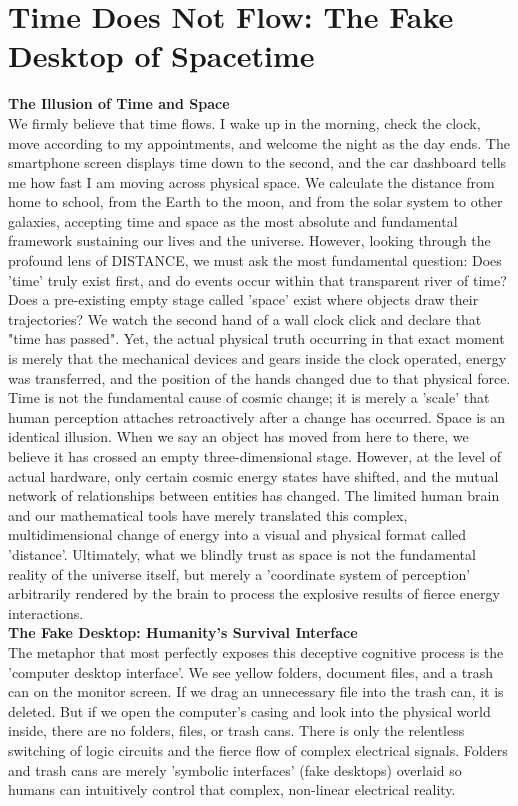 

\section{Time Does Not Flow: The Fake Desktop of Spacetime}

\textbf{The Illusion of Time and Space} \\
We firmly believe that time flows. I wake up in the morning, check the clock, move according to my appointments, and welcome the night as the day ends. The smartphone screen displays time down to the second, and the car dashboard tells me how fast I am moving across physical space. We calculate the distance from home to school, from the Earth to the moon, and from the solar system to other galaxies, accepting time and space as the most absolute and fundamental framework sustaining our lives and the universe.
However, looking through the profound lens of DISTANCE, we must ask the most fundamental question: Does 'time' truly exist first, and do events occur within that transparent river of time? Does a pre-existing empty stage called 'space' exist where objects draw their trajectories?
We watch the second hand of a wall clock click and declare that "time has passed". Yet, the actual physical truth occurring in that exact moment is merely that the mechanical devices and gears inside the clock operated, energy was transferred, and the position of the hands changed due to that physical force. Time is not the fundamental cause of cosmic change; it is merely a 'scale' that human perception attaches retroactively after a change has occurred.
Space is an identical illusion. When we say an object has moved from here to there, we believe it has crossed an empty three-dimensional stage. However, at the level of actual hardware, only certain cosmic energy states have shifted, and the mutual network of relationships between entities has changed. The limited human brain and our mathematical tools have merely translated this complex, multidimensional change of energy into a visual and physical format called 'distance'. Ultimately, what we blindly trust as space is not the fundamental reality of the universe itself, but merely a 'coordinate system of perception' arbitrarily rendered by the brain to process the explosive results of fierce energy interactions.\\
\textbf{The Fake Desktop: Humanity's Survival Interface} \\
The metaphor that most perfectly exposes this deceptive cognitive process is the 'computer desktop interface'. We see yellow folders, document files, and a trash can on the monitor screen. If we drag an unnecessary file into the trash can, it is deleted. But if we open the computer's casing and look into the physical world inside, there are no folders, files, or trash cans. There is only the relentless switching of logic circuits and the fierce flow of complex electrical signals. Folders and trash cans are merely 'symbolic interfaces' (fake desktops) overlaid so humans can intuitively control that complex, non-linear electrical reality.
